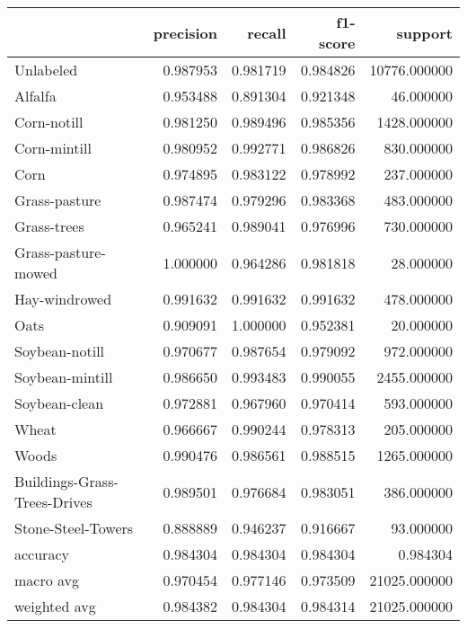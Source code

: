 \begin{tabular}{lrrrr}
\toprule
{} &  precision &    recall &  f1-score &       support \\
\midrule
Unlabeled                    &   0.987953 &  0.981719 &  0.984826 &  10776.000000 \\
Alfalfa                      &   0.953488 &  0.891304 &  0.921348 &     46.000000 \\
Corn-notill                  &   0.981250 &  0.989496 &  0.985356 &   1428.000000 \\
Corn-mintill                 &   0.980952 &  0.992771 &  0.986826 &    830.000000 \\
Corn                         &   0.974895 &  0.983122 &  0.978992 &    237.000000 \\
Grass-pasture                &   0.987474 &  0.979296 &  0.983368 &    483.000000 \\
Grass-trees                  &   0.965241 &  0.989041 &  0.976996 &    730.000000 \\
Grass-pasture-mowed          &   1.000000 &  0.964286 &  0.981818 &     28.000000 \\
Hay-windrowed                &   0.991632 &  0.991632 &  0.991632 &    478.000000 \\
Oats                         &   0.909091 &  1.000000 &  0.952381 &     20.000000 \\
Soybean-notill               &   0.970677 &  0.987654 &  0.979092 &    972.000000 \\
Soybean-mintill              &   0.986650 &  0.993483 &  0.990055 &   2455.000000 \\
Soybean-clean                &   0.972881 &  0.967960 &  0.970414 &    593.000000 \\
Wheat                        &   0.966667 &  0.990244 &  0.978313 &    205.000000 \\
Woods                        &   0.990476 &  0.986561 &  0.988515 &   1265.000000 \\
Buildings-Grass-Trees-Drives &   0.989501 &  0.976684 &  0.983051 &    386.000000 \\
Stone-Steel-Towers           &   0.888889 &  0.946237 &  0.916667 &     93.000000 \\
accuracy                     &   0.984304 &  0.984304 &  0.984304 &      0.984304 \\
macro avg                    &   0.970454 &  0.977146 &  0.973509 &  21025.000000 \\
weighted avg                 &   0.984382 &  0.984304 &  0.984314 &  21025.000000 \\
\bottomrule
\end{tabular}
